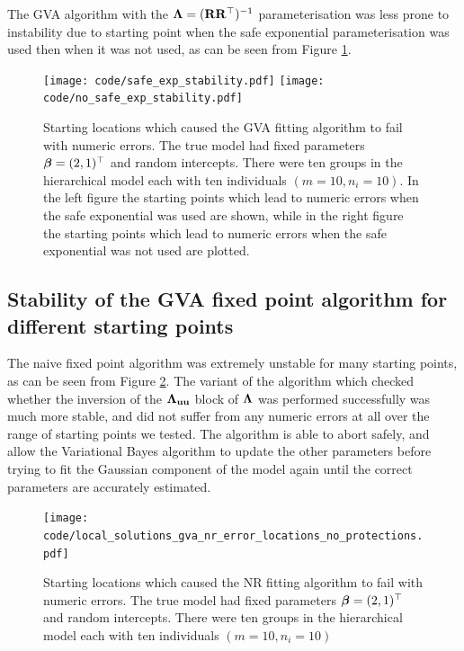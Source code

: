 The GVA algorithm with the ${\boldsymbol \Lambda} = ({\bf R} {\bf R}^\top)^{-1}$ parameterisation
was less prone to instability due to starting point when the safe exponential
parameterisation was used then when it was not used, as can be seen from Figure
\ref{fig:stability_locations_gva}. %
\begin{figure}[h]
	\texttt{[image: code/safe\_exp\_stability.pdf]}
	\texttt{[image: code/no\_safe\_exp\_stability.pdf]}
	\label{fig:stability_locations_gva}
	\caption{
        Starting locations which caused the GVA fitting algorithm to fail with
        numeric errors. The true model had fixed parameters ${\boldsymbol \beta} = (2,
        1)^\top$ and random intercepts. There were ten groups in the
        hierarchical model each	with ten individuals $(m=10, n_i=10)$. In the
        left figure the starting points which lead to numeric errors when the
        safe exponential was used are shown, while in the right figure the
        starting points which lead to numeric errors when the safe exponential
        was not used are plotted.
    }
    \end{figure}

\subsection{Stability of the GVA fixed point algorithm for different starting
points}
The naive fixed point algorithm was extremely unstable for many starting
points, as can be seen from Figure \ref{fig:stability_locations_nr}.  The
variant of the algorithm which checked whether the inversion of the
${\boldsymbol \Lambda}_{{\bf u} {\bf u}}$ block of ${\boldsymbol \Lambda}$ was performed successfully was much
more stable, and did not suffer from any numeric errors at all over the range
of starting points we tested.  The algorithm is able to abort safely, and allow
the Variational Bayes algorithm to update the other parameters before trying to
fit the Gaussian component of the model again until the correct parameters are
accurately estimated.

\begin{figure}[h!]
	\texttt{[image: code/local\_solutions\_gva\_nr\_error\_locations\_no\_protections.pdf]}
	\label{fig:stability_locations_nr}
	\caption{Starting locations which caused the NR fitting algorithm to fail with numeric errors. The true model had fixed parameters ${\boldsymbol \beta} = (2, 1)^\top$ and random intercepts. There were ten groups in the
	hierarchical model each	with ten individuals $(m=10, n_i=10)$}
\end{figure}

